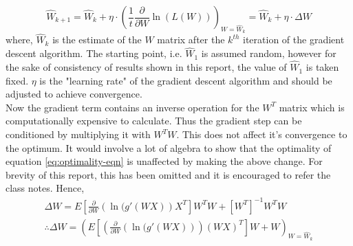 \documentclass[journal,onecolumn,12pt]{IEEEtran}
\begin{document}
\begin{equation}
    \hat{W}_{k+1} = \hat{W}_k + \eta\cdot\left(\frac{1}{t}\frac{\partial}{\partial W}\ln(L(W))\right)_{W=\hat{W}_k} = \hat{W}_k + \eta\cdot\Delta W
\end{equation}
where, $\hat{W}_k$ is the estimate of the $W$ matrix after the $k^{th}$ iteration of the gradient descent algorithm. The starting point, i.e. $\hat{W}_1$ is assumed random, however for the sake of consistency of results shown in this report, the value of $\hat{W}_1$ is taken fixed. $\eta$ is the "learning rate" of the gradient descent algorithm and should be adjusted to achieve convergence.\\
Now the gradient term contains an inverse operation  for the $W^T$ matrix which is computationally expensive to calculate. Thus the gradient step can be conditioned by multiplying it with $W^TW$. This does not affect it's convergence to the optimum. It would involve a lot of algebra to show that the optimality of equation \ref{eq:optimality-eqn} is unaffected by making the above change. For brevity of this report, this has been omitted and it is encouraged to refer the class notes. Hence,
\begin{eqnarray}
    \Delta W = E\left[\frac{\partial}{\partial W}(\ln{(g'(WX)})X^T\right] W^TW + \left[W^T\right]^{-1} W^TW \\
    \therefore    \Delta W = \left(E\left[\left(\frac{\partial}{\partial W}(\ln{(g'(WX)})\right)(WX)^T\right] W + W\right)_{W=\hat{W}_k}
    \label{eq:delta W simplified}
\end{eqnarray}
\end{document}
